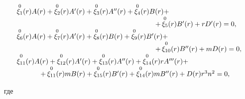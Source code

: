 \begin{equation}  

\begin{array}{l}

\mathop{\xi_1}\limits^{0}(r)A(r)+\mathop{\xi_2}\limits^{0}(r)A'(r)+\mathop{\xi_3}\limits^{0}(r)A''(r)+\mathop{\xi_4}\limits^{0}(r)B(r) +

\\

\hspace{7cm}

 +\mathop{\xi_5}\limits^{0}(r)B'(r)+r   D'(r)=0,%

\\ 

\mathop{\xi_6}\limits^{0}(r)A(r)+\mathop{\xi_7}\limits^{0}(r)A'(r)+\mathop{\xi_8}\limits^{0}(r)B(r)+\mathop{\xi_9}\limits^{0}(r)B'(r) +\\

\hspace{7cm}

 +\mathop{\xi_{10}}\limits^{0}(r)B''(r)+m   D(r)=0, 

\\ 

\mathop{\xi_{11}}\limits^{0}(r)A(r)+\mathop{\xi_{12}}\limits^{0}(r)A'(r)+\mathop{\xi_{13}}\limits^{0}(r)A''(r)+\mathop{\xi_{14}}\limits^{0}(r)r   A'''(r)+

\\

\hspace{1.2cm}

+\mathop{\xi_{11}}\limits^{0}(r)mB(r)

+\mathop{\xi_{15}}\limits^{0}(r)B'(r)+\mathop{\xi_{14}}\limits^{0}(r)m   B''(r)+D(r)   r^3n^2=0, 

\end{array}

\label{eq:gotbuntov_30} 

\end{equation}

где

